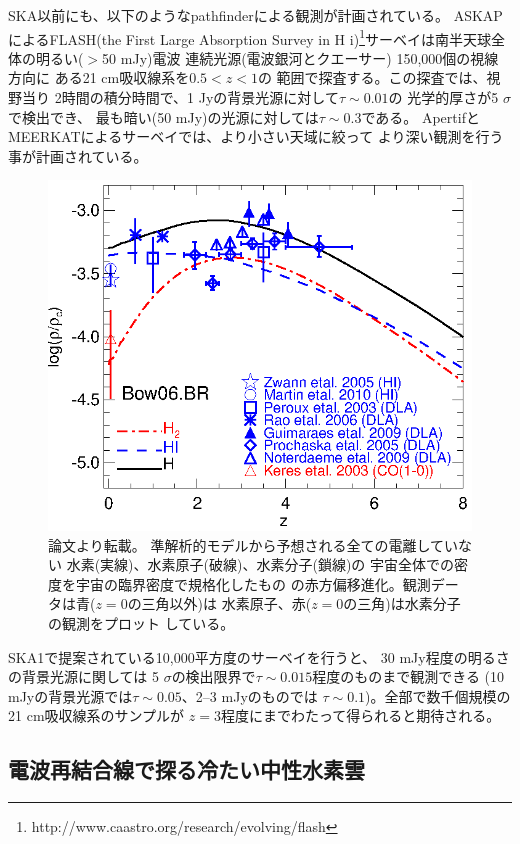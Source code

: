 SKA以前にも、以下のようなpathfinderによる観測が計画されている。
ASKAPによるFLASH(the First Large Absorption Survey in
H {\sc i})\footnote{http://www.caastro.org/research/evolving/flash}サーベイは南半天球全体の明るい($>$50 mJy)電波
連続光源(電波銀河とクエーサー) 150,000個の視線方向に
ある21 cm吸収線系を$0.5<z<1$の
範囲で探査する。この探査では、視野当り
2時間の積分時間で、1 Jyの背景光源に対して$\tau\sim 0.01$の
光学的厚さが5 $\sigma$で検出でき、
最も暗い(50 mJy)の光源に対しては$\tau\sim 0.3$である。
ApertifとMEERKATによるサーベイでは、より小さい天域に絞って
より深い観測を行う事が計画されている。

\begin{figure}[tbp]
\begin{center}
\includegraphics[width=0.7\linewidth]{galaxy/lagos_HI_H2a.eps}
\end{center}
\vspace{-1cm}
\caption{論文\citep{2011MNRAS.418.1649L}より転載。
準解析的モデルから予想される全ての電離していない
水素(実線)、水素原子(破線)、水素分子(鎖線)の
宇宙全体での密度を宇宙の臨界密度で規格化したもの
の赤方偏移進化。観測データは青($z=0$の三角以外)は
水素原子、赤($z=0$の三角)は水素分子の観測をプロット
している。}
\label{fig:lagos}
\end{figure}

SKA1で提案されている10,000平方度のサーベイを行うと、
30 mJy程度の明るさの背景光源に関しては
5 $\sigma$の検出限界で$\tau\sim 0.015$程度のものまで観測できる
(10 mJyの背景光源では$\tau\sim 0.05$、2--3 mJyのものでは
$\tau\sim 0.1$)。全部で数千個規模の21 cm吸収線系のサンプルが
$z=3$程度にまでわたって得られると期待される。

\subsection{電波再結合線で探る冷たい中性水素雲}


